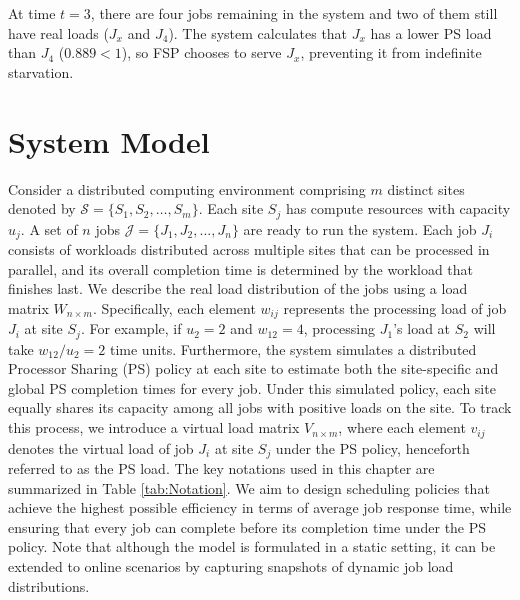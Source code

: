 At time $t=3$, there are four jobs remaining in the system and two of them still have real loads ($J_x$ and $J_4$). The system calculates that $J_x$ has a lower PS load than $J_4$ ($0.889 < 1$), so FSP chooses to serve $J_x$, preventing it from indefinite starvation.


\section{System Model}
\label{sec:model}
Consider a distributed computing environment comprising $m$ distinct sites denoted by $\mathcal{S} = \{S_1, S_2, \dots, S_m\}$. Each site $S_j$ has compute resources with capacity $u_j$. A set of $n$ jobs $\mathcal{J} = \{J_1, J_2, ..., J_n\}$ are ready to run the system. Each job $J_i$ consists of workloads distributed across multiple sites that can be processed in parallel, and its overall completion time is determined by the workload that finishes last. %
We describe the real load distribution of the jobs using a load matrix $W_{n\times m}$. Specifically, each element $w_{ij}$ represents the processing load of job $J_i$ at site $S_j$. For example, if $u_2=2$ and $w_{12}=4$, processing $J_1$'s load at $S_2$ will take $w_{12}/u_2=2$ time units. Furthermore, the system simulates a distributed Processor Sharing (PS) policy at each site to estimate both the site-specific and global PS completion times for every job. Under this simulated policy, each site equally shares its capacity among all jobs with positive loads on the site. To track this process, we introduce a virtual load matrix $V_{n\times m}$, where each element $v_{ij}$ denotes the virtual load of job $J_i$ at site $S_j$ under the PS policy, henceforth referred to as the PS load. The key notations used in this chapter are summarized in Table \ref{tab:Notation}. We aim to design scheduling policies that achieve the highest possible efficiency in terms of average job response time, while ensuring that every job can complete before its completion time under the PS policy. Note that although the model is formulated in a static setting, it can be extended to online scenarios by capturing snapshots of dynamic job load distributions. 

